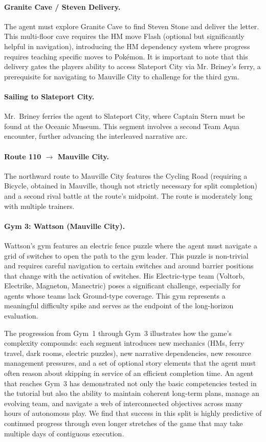 \paragraph{Granite Cave / Steven Delivery.} The agent must explore Granite Cave to find Steven Stone and deliver the letter. This multi-floor cave requires the HM move Flash (optional but significantly helpful in navigation), introducing the HM dependency system where progress requires teaching specific moves to Pok\'{e}mon. It is important to note that this delivery gates the players ability to access Slateport City via Mr. Briney's ferry, a prerequisite for navigating to Mauville City to challenge for the third gym. 

\paragraph{Sailing to Slateport City.} Mr.\ Briney ferries the agent to Slateport City, where Captain Stern must be found at the Oceanic Museum. This segment involves a second Team Aqua encounter, further advancing the interleaved narrative arc.

\paragraph{Route 110 $\to$ Mauville City.} The northward route to Mauville City features the Cycling Road (requiring a Bicycle, obtained in Mauville, though not strictly necessary for split completion) and a second rival battle at the route's midpoint. The route is moderately long with multiple trainers.

\paragraph{Gym 3: Wattson (Mauville City).} Wattson's gym features an electric fence puzzle where the agent must navigate a grid of switches to open the path to the gym leader. This puzzle is non-trivial and requires careful navigation to certain switches and around barrier positions that change with the activation of switches. His Electric-type team (Voltorb, Electrike, Magneton, Manectric) poses a significant challenge, especially for agents whose teams lack Ground-type coverage. This gym represents a meaningful difficulty spike and serves as the endpoint of the long-horizon evaluation.

\vspace{1em}
The progression from Gym~1 through Gym~3 illustrates how the game's complexity compounds: each segment introduces new mechanics (HMs, ferry travel, dark rooms, electric puzzles), new narrative dependencies, new resource management pressures, and a set of optional story elements that the agent must often reason about skipping in service of an efficient completion time. An agent that reaches Gym~3 has demonstrated not only the basic competencies tested in the tutorial but also the ability to maintain coherent long-term plans, manage an evolving team, and navigate a web of interconnected objectives across many hours of autonomous play. We find that success in this split is highly predictive of continued progress through even longer stretches of the game that may take multiple days of contiguous execution.

